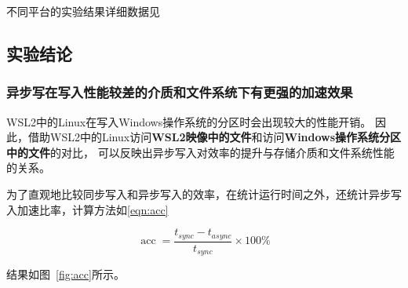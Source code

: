 \documentclass[a4paper,twoside]{article}
\begin{document}
\begin{spacing}{1.2}
不同平台的实验结果详细数据见

\subsection{实验结论}

\subsubsection{异步写在写入性能较差的介质和文件系统下有更强的加速效果}

WSL2中的Linux在写入Windows操作系统的分区时会出现较大的性能开销\cite{githubwsl2Filesystem}。
因此，借助WSL2中的Linux访问\textbf{WSL2映像中的文件}和访问\textbf{Windows操作系统分区中的文件}的对比，
可以反映出异步写入对效率的提升与存储介质和文件系统性能的关系。

为了直观地比较同步写入和异步写入的效率，在统计运行时间之外，还统计异步写入加速比率，计算方法如\eqref{eqn:acc}

\begin{equation}
	\label{eqn:acc}
	\mathop{\mathrm{acc}}=\frac{t_{sync}-t_{async}}{t_{sync}} \times 100\%
\end{equation}

结果如图~\ref{fig:acc}所示。


\end{spacing}
\end{document}
